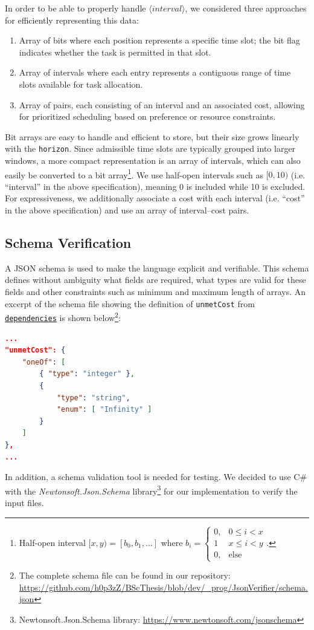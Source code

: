 In order to be able to properly handle $\langle\mathrm{\textit{interval}}\rangle$, we considered three approaches for efficiently representing this data:
\begin{enumerate}
    \item Array of bits where each position represents a specific time slot; the bit flag indicates whether the task is permitted in that slot.
    \item Array of intervals where each entry represents a contiguous range of time slots available for task allocation.
    \item Array of pairs, each consisting of an interval and an associated cost, allowing for prioritized scheduling based on preference or resource constraints.
\end{enumerate}
Bit arrays are easy to handle and efficient to store, but their size grows linearly with the \texttt{horizon}. Since admissible time slots are typically grouped into larger windows, a more compact representation is an array of intervals, which can also easily be converted to a bit array\footnote{Half-open interval $[x,y) = [b_0, b_1, \dots]$ where $b_i = \begin{cases}0, & 0 \leq i < x\\ 1 & x \leq i < y\\ 0, & \text{else}\end{cases}$.}. We use half-open intervals such as $[0,10)$ (i.e. ``interval'' in the above specification), meaning 0 is included while 10 is excluded. For expressiveness, we additionally associate a cost with each interval (i.e. ``cost'' in the above specification) and use an array of interval--cost pairs.

\subsection{Schema Verification}
\label{subsec:methodology-language-design:language-specification:schema-verification}
A \ac{JSON} schema is used to make the language explicit and verifiable. This schema defines without ambiguity what fields are required, what types are valid for these fields and other constraints such as minimum and maximum length of arrays. An excerpt of the schema file showing the definition of \texttt{unmetCost} from \texttt{\hyperref[subsubsec:methodology-language-design:dependencies]{dependencies}} is shown below\footnote{The complete schema file can be found in our repository: \url{https://github.com/h0p3zZ/BScThesis/blob/dev/_prog/JsonVerifier/schema.json}}:
\begin{lstlisting}[language=json]
...
"unmetCost": {
    "oneOf": [
        { "type": "integer" },
        {
            "type": "string",
            "enum": [ "Infinity" ]
        }
    ]
},
...
\end{lstlisting}
In addition, a schema validation tool is needed for testing. We decided to use C\# with the \textit{Newtonsoft.Json.Schema} library\footnote{Newtonsoft.Json.Schema library: \url{https://www.newtonsoft.com/jsonschema}} for our implementation to verify the input files.

